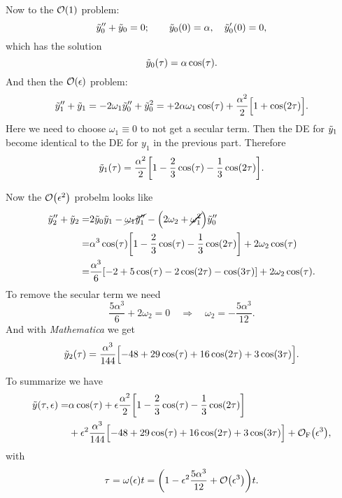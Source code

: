 \documentclass[11pt,letter, swedish, english
]{article}
\begin{document}
Now to the $\order{1}$ problem:
\begin{equation}
\tilde{y}_0''+\tilde{y}_0=0;\qquad
\tilde{y}_0(0)=\alpha,\quad {\ensuremath{\tilde{y}}_0'}(0)=0,
\end{equation}
which has the solution
\begin{equation}
\tilde{y}_0(\tau)=\alpha\cos(\tau).
\end{equation}
And then the $\order{\epsilon}$ problem:
\begin{equation}
\tilde{y}_1''+\tilde{y}_1=-2\omega_1\tilde{y}_0''+\tilde{y}_0^2
=+2\alpha\omega_1\cos(\tau)
+\frac{\alpha^2}{2}\Big[1+\cos(2\tau)\Big].
\end{equation}
Here we need to choose $\omega_1\equiv0$ to not get a secular
term. Then the DE for $\tilde{y}_1$ become identical to the DE for $y_1$ in
the previous part. Therefore
\begin{equation}
\tilde{y}_1(\tau)=\frac{\alpha^2}{2}
\qty[1-\frac{2}{3}\cos(\tau)-\frac{1}{3}\cos(2\tau)].
\end{equation}

Now the $\order{\epsilon^2}$ probelm looks like
\begin{equation}
\begin{aligned}
\tilde{y}_2''+\tilde{y}_2=&2\tilde{y}_0\tilde{y}_1-\cancel{\omega_1\tilde{y}_1''}-\qty(2\omega_2+\cancel{\omega_1^2})\tilde{y}_0''\\
=&\alpha^3\cos(\tau)\qty[1-\frac{2}{3}\cos(\tau)-\frac{1}{3}\cos(2\tau)]+2\omega_2\cos(\tau)
\\=&\frac{\alpha^3}{6}\qty[-2+5\cos(\tau)-2\cos(2\tau)-\cos(3\tau)]+2\omega_2\cos(\tau).
\end{aligned}
\end{equation}
To remove the secular term we need
\begin{equation}
\frac{5\alpha^3}{6}+2\omega_2=0
\quad\Longrightarrow\quad
\omega_2=-\frac{5\alpha^3}{12}.
\end{equation}
And with \textit{Mathematica} we get
\begin{equation}
\tilde{y}_2(\tau)=\frac{\alpha^3}{144}
\qty[-48+29\cos(\tau)+16\cos(2\tau)+3\cos(3\tau)\Big.].
\end{equation}

To summarize we have
\begin{equation}
\begin{aligned}
\tilde{y}(\tau, \epsilon)=&\alpha\cos(\tau)+\epsilon\frac{\alpha^2}{2}
\qty[1-\frac{2}{3}\cos(\tau)-\frac{1}{3}\cos(2\tau)]\\
&+\epsilon^2\frac{\alpha^3}{144}
\qty[-48+29\cos(\tau)+16\cos(2\tau)+3\cos(3\tau)\Big.]
+\mathcal{O}_\text{F}\qty(\epsilon^3),
\end{aligned}
\end{equation}
with
\begin{equation}\label{eq:4b_t}
\tau=\omega(\epsilon)t=\qty(1-\epsilon^2\frac{5\alpha^3}{12}+\order{\epsilon^3})t.
\end{equation}
\end{document}
